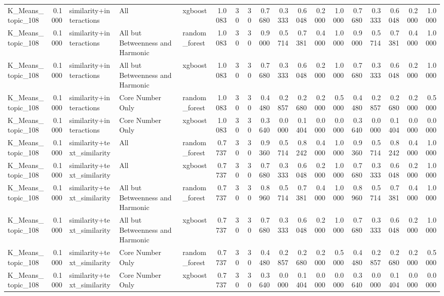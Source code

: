 \begin{tabular}{lrlllrrrrrrrrrrrrr}
K_Means_topic_108 & 0.1000 & similarity+interactions & All & xgboost & 1.0083 & 30 & 30 & 0.7680 & 0.3333 & 0.6048 & 0.2000 & 1.0000 & 0.7680 & 0.3333 & 0.6048 & 0.2000 & 1.0000 \\
K_Means_topic_108 & 0.1000 & similarity+interactions & All but Betweenness and Harmonic & random_forest & 1.0083 & 30 & 30 & 0.9000 & 0.5714 & 0.7381 & 0.4000 & 1.0000 & 0.9000 & 0.5714 & 0.7381 & 0.4000 & 1.0000 \\
K_Means_topic_108 & 0.1000 & similarity+interactions & All but Betweenness and Harmonic & xgboost & 1.0083 & 30 & 30 & 0.7680 & 0.3333 & 0.6048 & 0.2000 & 1.0000 & 0.7680 & 0.3333 & 0.6048 & 0.2000 & 1.0000 \\
K_Means_topic_108 & 0.1000 & similarity+interactions & Core Number Only & random_forest & 1.0083 & 30 & 30 & 0.4480 & 0.2857 & 0.2680 & 0.2000 & 0.5000 & 0.4480 & 0.2857 & 0.2680 & 0.2000 & 0.5000 \\
K_Means_topic_108 & 0.1000 & similarity+interactions & Core Number Only & xgboost & 1.0083 & 30 & 30 & 0.3640 & 0.0000 & 0.1404 & 0.0000 & 0.0000 & 0.3640 & 0.0000 & 0.1404 & 0.0000 & 0.0000 \\
K_Means_topic_108 & 0.1000 & similarity+text_similarity & All & random_forest & 0.7737 & 30 & 30 & 0.9360 & 0.5714 & 0.8242 & 0.4000 & 1.0000 & 0.9360 & 0.5714 & 0.8242 & 0.4000 & 1.0000 \\
K_Means_topic_108 & 0.1000 & similarity+text_similarity & All & xgboost & 0.7737 & 30 & 30 & 0.7680 & 0.3333 & 0.6048 & 0.2000 & 1.0000 & 0.7680 & 0.3333 & 0.6048 & 0.2000 & 1.0000 \\
K_Means_topic_108 & 0.1000 & similarity+text_similarity & All but Betweenness and Harmonic & random_forest & 0.7737 & 30 & 30 & 0.8960 & 0.5714 & 0.7381 & 0.4000 & 1.0000 & 0.8960 & 0.5714 & 0.7381 & 0.4000 & 1.0000 \\
K_Means_topic_108 & 0.1000 & similarity+text_similarity & All but Betweenness and Harmonic & xgboost & 0.7737 & 30 & 30 & 0.7680 & 0.3333 & 0.6048 & 0.2000 & 1.0000 & 0.7680 & 0.3333 & 0.6048 & 0.2000 & 1.0000 \\
K_Means_topic_108 & 0.1000 & similarity+text_similarity & Core Number Only & random_forest & 0.7737 & 30 & 30 & 0.4480 & 0.2857 & 0.2680 & 0.2000 & 0.5000 & 0.4480 & 0.2857 & 0.2680 & 0.2000 & 0.5000 \\
K_Means_topic_108 & 0.1000 & similarity+text_similarity & Core Number Only & xgboost & 0.7737 & 30 & 30 & 0.3640 & 0.0000 & 0.1404 & 0.0000 & 0.0000 & 0.3640 & 0.0000 & 0.1404 & 0.0000 & 0.0000 \\

\end{tabular}
